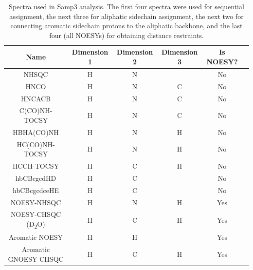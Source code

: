 \begin{table}[h]
    \begin{tabular}{ | c || c | c | c | c | c |}
    \hline
      Name              &  Dimension 1  &  Dimension 2  &  Dimension 3  &  Is NOESY?    \\    \hline
      NHSQC             &  H            &  N            &               &  No           \\    \hline
      HNCO              &  H            &  N            &  C            &  No           \\    \hline
      HNCACB            &  H            &  N            &  C            &  No           \\    \hline
      C(CO)NH-TOCSY     &  H            &  N            &  C            &  No           \\    \hline
      HBHA(CO)NH        &  H            &  N            &  H            &  No           \\    \hline
      HC(CO)NH-TOCSY    &  H            &  N            &  H            &  No           \\    \hline
      HCCH-TOCSY        &  H            &  C            &  H            &  No           \\    \hline
      hbCBcgcdHD        &  H            &  C            &               &  No           \\    \hline
      hbCBcgcdceHE      &  H            &  C            &               &  No           \\    \hline
      NOESY-NHSQC       &  H            &  N            &  H            &  Yes          \\    \hline
NOESY-CHSQC (D\textsubscript{2}O) & H   &  C            &  H            &  Yes          \\    \hline
      Aromatic NOESY    &  H            &  H            &               &  Yes          \\    \hline
 Aromatic GNOESY-CHSQC  &  H            &  C            &  H            &  Yes          \\    \hline
    \end{tabular}
    \caption[Spectra used in Samp3 analysis.]
            {Spectra used in Samp3 analysis.  The first four spectra were used
             for sequential assignment, the next three for aliphatic sidechain
             assignment, the next two for connecting aromatic sidechain protons
             to the aliphatic backbone, and the last four (all NOESYs) for
             obtaining distance restraints.}
    \label{samp3_spectra}
\end{table}

